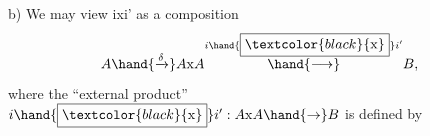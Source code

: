b) We may view ixi' as a composition
\[ A \hand{\xrightarrow{\delta}} A\mathrm{x} A \overset{i\hand{\boxed{\textcolor{black}{\mathrm{x}}}} i'}{\hand{\longrightarrow}} B , \]
where the ``external product'' $i\hand{\boxed{\textcolor{black}{\mathrm{x}}}} i' : A\mathrm{x} A \hand{\to} B$ is defined by
